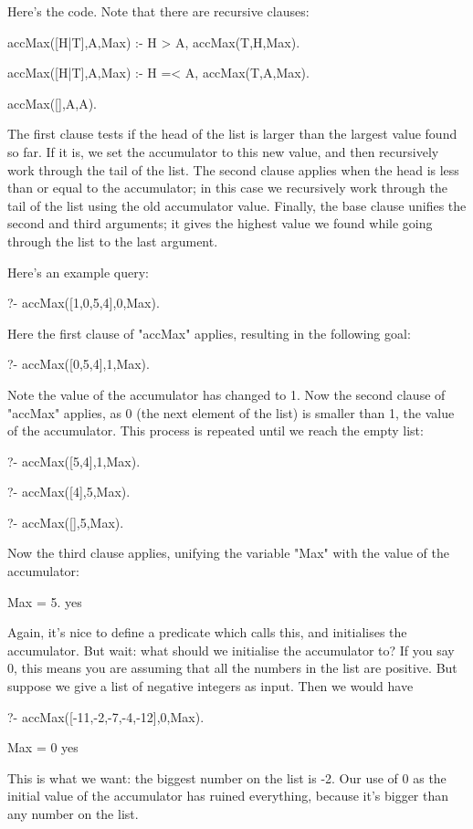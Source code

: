 Here's the code.  Note that there are  recursive clauses:
\begin{LPNcodedisplay}
accMax([H|T],A,Max) :-
   H > A,
   accMax(T,H,Max).

accMax([H|T],A,Max) :-
   H =< A,
   accMax(T,A,Max).

accMax([],A,A).
\end{LPNcodedisplay}
The first clause tests if the head of the list is larger than the
largest value found so far.  If it is, we set the accumulator to this
new value, and then recursively work through the tail of the list.
The second clause applies when the head is less than or equal to the
accumulator; in this case we recursively work through the tail of the
list using the old accumulator value.  Finally, the base clause
unifies the second and third arguments; it gives the highest value we
found while going through the list to the last argument.

Here's an
example query:
\begin{LPNcodedisplay}
?- accMax([1,0,5,4],0,Max).
\end{LPNcodedisplay}
Here the first clause of "accMax" applies, resulting in the following
goal:
\begin{LPNcodedisplay}
?- accMax([0,5,4],1,Max).
\end{LPNcodedisplay}
Note the value of the accumulator has changed to 1.  Now the second
clause of "accMax" applies, as 0 (the next element of the list) is
smaller than 1, the value of the accumulator.
This process is repeated until
we reach the empty list:
\begin{LPNcodedisplay}
?- accMax([5,4],1,Max).

?- accMax([4],5,Max).

?- accMax([],5,Max).
\end{LPNcodedisplay}
Now the third clause applies, unifying the variable "Max"
with the value of the accumulator:
\begin{LPNcodedisplay}
Max = 5.
yes
\end{LPNcodedisplay}

Again, it's nice to define a predicate which calls this, and
initialises the accumulator.  But wait: what should we initialise the
accumulator to?  If you say 0, this means you are assuming that all
the numbers in the list are positive. But suppose we give
a list of negative integers as input. Then we would have
\begin{LPNcodedisplay}
?- accMax([-11,-2,-7,-4,-12],0,Max).

Max = 0
yes
\end{LPNcodedisplay}
This is  what we want: the biggest number on the list is
-2.  Our use of 0 as the initial value of the accumulator has ruined
everything, because it's bigger than any number on the list.

